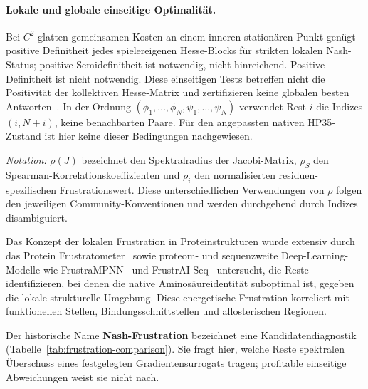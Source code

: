 \documentclass[12pt,a4paper]{article}
\theoremstyle{remark}
\begin{document}
\paragraph{Lokale und globale einseitige Optimalität.}
Bei $C^2$-glatten gemeinsamen Kosten an einem inneren stationären Punkt genügt positive Definitheit jedes spielereigenen Hesse-Blocks für strikten lokalen Nash-Status; positive Semidefinitheit ist notwendig, nicht hinreichend. Positive Definitheit ist nicht notwendig. Diese einseitigen Tests betreffen nicht die Positivität der kollektiven Hesse-Matrix und zertifizieren keine globalen besten Antworten~\citep{RatliffBurdenSastry2016}. In der Ordnung $(\phi_1,\ldots,\phi_N,\psi_1,\ldots,\psi_N)$ verwendet Rest $i$ die Indizes $(i,N+i)$, keine benachbarten Paare. Für den angepassten nativen HP35-Zustand ist hier keine dieser Bedingungen nachgewiesen.




\noindent\textit{Notation:} $\rho(J)$ bezeichnet den Spektralradius der Jacobi-Matrix, $\rho_S$ den Spearman-Korrelationskoeffizienten und $\rho_i$ den normalisierten residuen-spezifischen Frustrationswert. Diese unterschiedlichen Verwendungen von $\rho$ folgen den jeweiligen Community-Konventionen und werden durchgehend durch Indizes disambiguiert.

Das Konzept der lokalen Frustration in Proteinstrukturen wurde extensiv durch das Protein Frustratometer~\citep{Ferreiro2007,Ferreiro2014} sowie proteom- und sequenzweite Deep-Learning-Modelle wie FrustraMPNN~\citep{Beining2026} und FrustrAI-Seq~\citep{Leusch2026} untersucht, die Reste identifizieren, bei denen die native Aminosäureidentität suboptimal ist, gegeben die lokale strukturelle Umgebung. Diese energetische Frustration korreliert mit funktionellen Stellen, Bindungsschnittstellen und allosterischen Regionen.

Der historische Name \textbf{Nash-Frustration} bezeichnet eine Kandidatendiagnostik (Tabelle~\ref{tab:frustration-comparison}). Sie fragt hier, welche Reste spektralen Überschuss eines festgelegten Gradientensurrogats tragen; profitable einseitige Abweichungen weist sie nicht nach.
\end{document}
